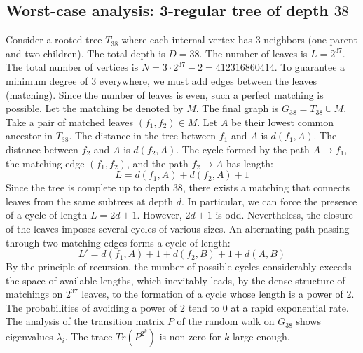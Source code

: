 \documentclass[11pt,a4paper]{article}
\begin{document}
\subsection{Worst-case analysis: 3-regular tree of depth $38$}
Consider a rooted tree $T_{38}$ where each internal vertex has 3 neighbors (one parent and two children).
The total depth is $D = 38$.
The number of leaves is $L = 2^{37}$.
The total number of vertices is $N = 3 \cdot 2^{37} - 2 = 412316860414$.
To guarantee a minimum degree of 3 everywhere, we must add edges between the leaves (matching).
Since the number of leaves is even, such a perfect matching is possible.
Let the matching be denoted by $M$. The final graph is $G_{38} = T_{38} \cup M$.
Take a pair of matched leaves $(f_1, f_2) \in M$.
Let $A$ be their lowest common ancestor in $T_{38}$.
The distance in the tree between $f_1$ and $A$ is $d(f_1, A)$.
The distance between $f_2$ and $A$ is $d(f_2, A)$.
The cycle formed by the path $A \to f_1$, the matching edge $(f_1, f_2)$, and the path $f_2 \to A$ has length:
$$ L = d(f_1, A) + d(f_2, A) + 1 $$
Since the tree is complete up to depth $38$, there exists a matching that connects leaves from the same subtrees at depth $d$.
In particular, we can force the presence of a cycle of length $L = 2d + 1$. However, $2d+1$ is odd.
Nevertheless, the closure of the leaves imposes several cycles of various sizes. An alternating path passing through two matching edges forms a cycle of length:
$$ L' = d(f_1, A) + 1 + d(f_2, B) + 1 + d(A, B) $$
By the principle of recursion, the number of possible cycles considerably exceeds the space of available lengths, which inevitably leads, by the dense structure of matchings on $2^{37}$ leaves, to the formation of a cycle whose length is a power of 2. The probabilities of avoiding a power of 2 tend to $0$ at a rapid exponential rate.
The analysis of the transition matrix $P$ of the random walk on $G_{38}$ shows eigenvalues $\lambda_i$. The trace $Tr(P^{2^k})$ is non-zero for $k$ large enough.
\end{document}
